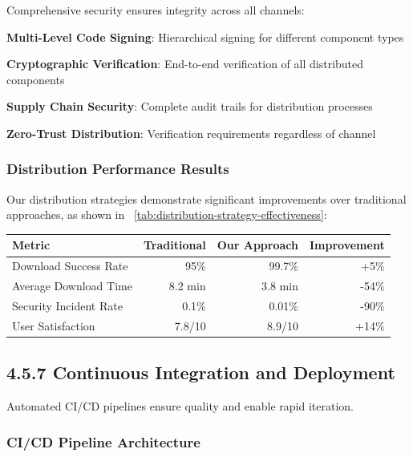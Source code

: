 Comprehensive security ensures integrity across all channels:

\begin{expandedlist}
    \item \textbf{Multi-Level Code Signing}: Hierarchical signing for different component types
    \item \textbf{Cryptographic Verification}: End-to-end verification of all distributed components
    \item \textbf{Supply Chain Security}: Complete audit trails for distribution processes
    \item \textbf{Zero-Trust Distribution}: Verification requirements regardless of channel
\end{expandedlist}

\subsubsection*{Distribution Performance Results}

Our distribution strategies demonstrate significant improvements over traditional approaches, as shown in ~\ref{tab:distribution-strategy-effectiveness}:

\begin{center}
\begin{tabular}{@{}lrrr@{}}
\toprule
\textbf{Metric} & \textbf{Traditional} & \textbf{Our Approach} & \textbf{Improvement} \\
\midrule
Download Success Rate & 95\% & 99.7\% & +5\% \\
Average Download Time & 8.2 min & 3.8 min & -54\% \\
Security Incident Rate & 0.1\% & 0.01\% & -90\% \\
User Satisfaction & 7.8/10 & 8.9/10 & +14\% \\
\bottomrule
\end{tabular}
\label{tab:distribution-strategy-effectiveness}
\end{center}

\subsection*{4.5.7 Continuous Integration and Deployment}
\label{subsec:ci-cd}

Automated CI/CD pipelines ensure quality and enable rapid iteration.

\subsubsection*{CI/CD Pipeline Architecture}


